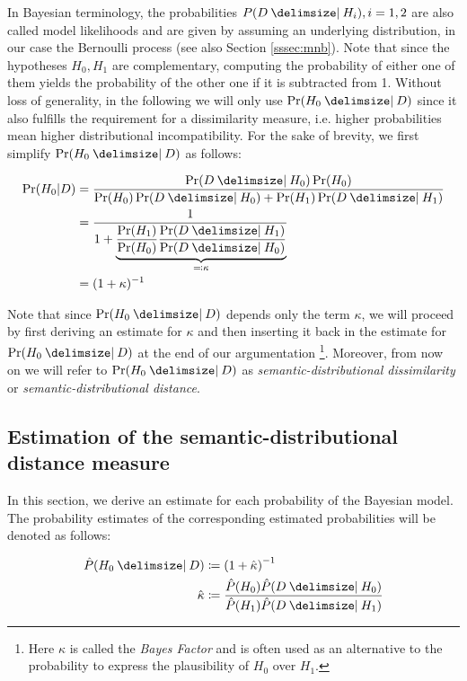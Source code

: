 In Bayesian terminology, the probabilities $P(D \given H_i), i=1,2$ are also called model likelihoods
and are given by assuming an underlying distribution, in our case the Bernoulli process (see also Section \ref{sssec:mnb}). 
Note that since the hypotheses $H_0, H_1$ are complementary, computing the probability of either one 
of them yields the probability of the other one if it is subtracted from 1.
Without loss of generality, in the following we will only use $\Pr(H_0 \given D)$ since it also fulfills
the requirement for a dissimilarity measure, i.e. higher probabilities mean higher distributional 
incompatibility. For the sake of brevity, we first simplify $\Pr(H_0 \given D)$ as follows:

\begin{equation*}
\begin{split}
	\Pr(H_0|D) &= \frac{\Pr(D \given H_0)\Pr(H_0)}{\Pr(H_0)\Pr(D \given H_0) + \Pr(H_1)\Pr(D \given H_1)} \\
			 & =\frac{1}{1+
			 \underbrace{\frac{\Pr(H_1)}{\Pr(H_0)}\frac{\Pr(D \given H_1)}{\Pr(D \given H_0)}}_{
			 \eqqcolon \kappa}} \\
			 &= (1+\kappa)^{-1} \\
\end{split}
\end{equation*}

Note that since $\Pr(H_0 \given D)$ depends only the term $\kappa$, 
we will proceed by first deriving an estimate for $\kappa$ and then inserting it back in the estimate for $\Pr(H_0 \given D)$ 
at the end of our argumentation \footnote{Here $\kappa$ is called the \emph{Bayes Factor} and is often used as an
alternative to the probability to express the plausibility of $H_0$ over $H_1$.}.
Moreover, from now on we will refer to $\Pr(H_0 \given D)$ as \emph{semantic-distributional dissimilarity} 
or \emph{semantic-distributional distance}.

\subsection{Estimation of the semantic-distributional distance measure}

In this section, we derive an estimate for each probability of the Bayesian model. 
The probability estimates of the corresponding estimated probabilities will be denoted as follows:

\begin{equation}
\begin{split}
\hat{P}(H_0 \given D) &\coloneqq \left(1 + \hat{\kappa}\right)^{-1} \\
\hat{\kappa} &\coloneqq \frac{\hat{P}(H_0)\hat{P}(D \given H_0)}{\hat{P}(H_1)\hat{P}(D \given H_1)} \\
\end{split}
\end{equation}  

